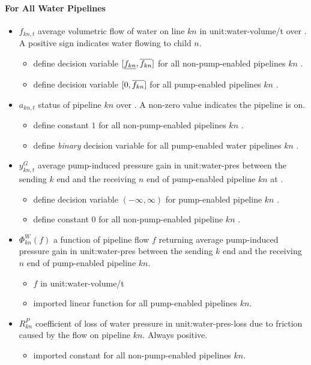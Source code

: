 \paragraph{For All Water Pipelines}
\begin{itemize}

\item $f_{kn,t}$ average volumetric flow of water on line $kn$ in
  \gls{unit:water-volume/t} over \intervaloft{}. A positive sign indicates water
  flowing to child $n$.
  \begin{itemize}
  \item \gls{define} decision variable $[\underline{f_{kn}}, \overline{f_{kn}}]$ for all
    non-pump-enabled pipelines $kn$ \atallt{}.
  \item \gls{define} decision variable $[0, \overline{f_{kn}}]$ for all pump-enabled
    pipelines $kn$ \atallt{}.
  \end{itemize}

\item $a_{kn,t}$ status of pipeline $kn$ over \intervaloft{}. A non-zero value
  indicates the pipeline is on.
  \begin{itemize}
  \item \gls{define} constant $1$ for all non-pump-enabled pipelines $kn$
    \atallt{}.
  \item \gls{define} \emph{binary} decision variable for all pump-enabled water
    pipelines $kn$ \atallt{}.
  \end{itemize}

\item $y^G_{kn,t}$ average pump-induced pressure gain in \gls{unit:water-pres}
  between the sending $k$ end and the receiving $n$ end of pump-enabled pipeline
  $kn$ at \intervaloft{}.
  \begin{itemize}
  \item \gls{define} decision variable $(-\infty, \infty)$ for pump-enabled
    pipeline $kn$ \atallt{}.
  \item \gls{define} constant $0$ for all non-pump-enabled pipeline $kn$
    \atallt{}.
  \end{itemize}

\item $\Phi^{W}_{kn}(f)$ a function of pipeline flow $f$ returning average
  pump-induced pressure gain in \gls{unit:water-pres} between the sending $k$
  end and the receiving $n$ end of pump-enabled pipeline $kn$.

  \begin{itemize}
  \item $f$ in \gls{unit:water-volume/t}
  \item \gls{imported} linear function for all pump-enabled pipelines $kn$.
  \end{itemize}

\item $R^P_{kn}$ coefficient of loss of water pressure in
  \gls{unit:water-pres-loss} due to friction caused by the flow on pipeline
  $kn$. Always positive.

  \begin{itemize}
  \item \gls{imported} constant for all non-pump-enabled pipelines $kn$.
  \end{itemize}

\end{itemize}

